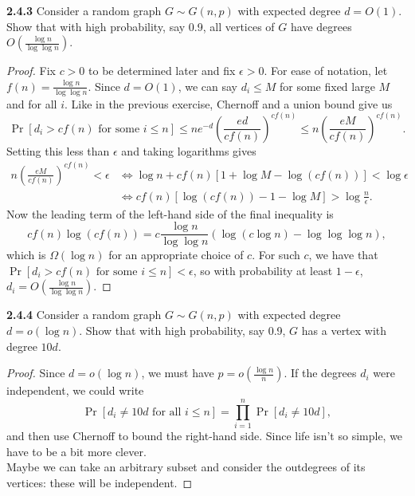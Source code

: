 \documentclass[11pt,letterpaper]{report}
\begin{document}
\noindent\textbf{2.4.3}
Consider a random graph $G\sim G(n, p)$ with expected degree $d = O(1)$. Show that with high probability, say 0.9, all vertices of $G$ have degrees $O(\frac{\log n}{\log\log n})$.
\begin{proof}
	Fix $c>0$ to be determined later and fix $\epsilon>0$. For ease of notation, let $f(n) = \frac{\log n}{\log\log n}$. Since $d = O(1)$, we can say $d_i \leq M$ for some fixed large $M$ and for all $i$. Like in the previous exercise, Chernoff and a union bound give us
	\[
	\Pr[d_i >cf(n)\text{ for some }i\leq n] \leq ne^{-d}\left(\frac{ed}{cf(n)}\right)^{cf(n)}\leq n\left(\frac{eM}{cf(n)}\right)^{cf(n)}.
	\]
	Setting this less than $\epsilon$ and taking logarithms gives
	\begin{align*}
		n\left(\frac{eM}{cf(n)}\right)^{cf(n)} <\epsilon &\iff \log n + cf(n)[1+\log M - \log(cf(n))]<\log \epsilon\\
		&\iff cf(n)[\log(cf(n))-1-\log M] > \log\frac{n}{\epsilon}.
	\end{align*}
	Now the leading term of the left-hand side of the final inequality is
	\[
	cf(n)\log(cf(n)) = c\frac{\log n}{\log\log n}\left(\log(c\log n) - \log\log\log n \right),
	\]
	which is $\Omega(\log n)$ for an appropriate choice of $c$. For such $c$, we have that $\Pr[d_i > cf(n)\text{ for some }i\leq n] <\epsilon$, so with probability at least $1-\epsilon$, $d_i = O(\frac{\log n}{\log\log n})$.
\end{proof}










\noindent\textbf{2.4.4}
Consider a random graph $G\sim G(n,p)$ with expected degree $d = o(\log n)$. Show that with high probability, say 0.9, $G$ has a vertex with degree $10d$.
\begin{proof}
	Since $d = o(\log n)$, we must have $p = o(\frac{\log n}{n})$. If the degrees $d_i$ were independent, we could write
	\[
	\Pr[d_i\neq 10d\text{ for all }i\leq n] = \prod_{i=1}^n\Pr[d_i \neq 10d],
	\]
	and then use Chernoff to bound the right-hand side. Since life isn't so simple, we have to be a bit more clever.\\

	Maybe we can take an arbitrary subset and consider the outdegrees of its vertices: these will be independent. 
\end{proof}
\end{document}
